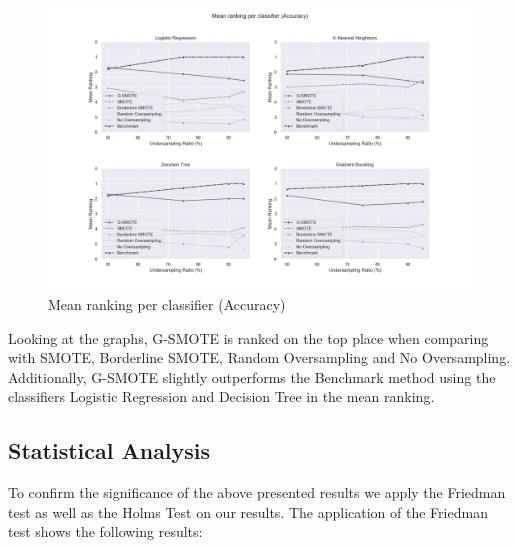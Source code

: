 \documentclass[parskip=full]{scrartcl}
\begin{document}
\begin{figure}[H]
	\includegraphics[width=1\linewidth]
		{resources/mean_ranking_per_classifier_accuracy}
	\caption{Mean ranking per classifier (Accuracy)}
	\label{fig:mean_ranking_per_classifier_accuracy}
\end{figure}

Looking at the graphs, G-SMOTE is ranked on the top place when comparing with 
SMOTE, Borderline SMOTE, Random Oversampling and No Oversampling. Additionally, 
G-SMOTE slightly outperforms the Benchmark method using the classifiers 
Logistic Regression and Decision Tree in the mean ranking. 

\subsection{Statistical Analysis}

To confirm the significance of the above presented results we apply the 
Friedman test as well as the Holms Test on our results. The application of the 
Friedman test shows the following results:
\end{document}
